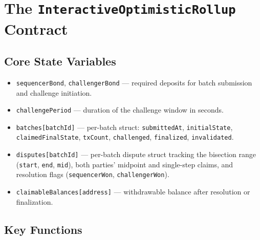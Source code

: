 \documentclass[11pt,letterpaper]{article}
\begin{document}
\section{The \texttt{InteractiveOptimisticRollup} Contract}

\subsection{Core State Variables}

\begin{itemize}[leftmargin=*, itemsep=2pt]
    \item \texttt{sequencerBond}, \texttt{challengerBond} --- required deposits for batch submission and challenge initiation.
    \item \texttt{challengePeriod} --- duration of the challenge window in seconds.
    \item \texttt{batches[batchId]} --- per-batch struct: \texttt{submittedAt}, \texttt{initialState}, \texttt{claimedFinalState}, \texttt{txCount}, \texttt{challenged}, \texttt{finalized}, \texttt{invalidated}.
    \item \texttt{disputes[batchId]} --- per-batch dispute struct tracking the bisection range (\texttt{start}, \texttt{end}, \texttt{mid}), both parties' midpoint and single-step claims, and resolution flags (\texttt{sequencerWon}, \texttt{challengerWon}).
    \item \texttt{claimableBalances[address]} --- withdrawable balance after resolution or finalization.
\end{itemize}

\subsection{Key Functions}
\end{document}
